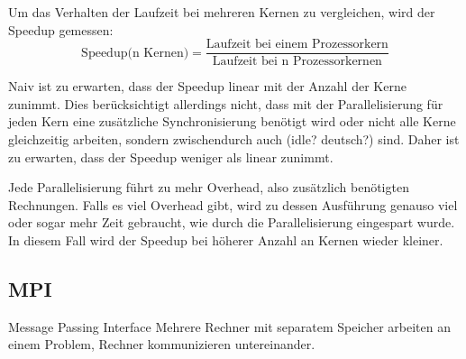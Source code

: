 	Um das Verhalten der Laufzeit bei mehreren Kernen zu vergleichen, wird der Speedup gemessen:
	\begin{equation}
	\text{Speedup(n Kernen)}=\frac{\text{Laufzeit bei einem Prozessorkern}}{\text{Laufzeit bei n Prozessorkernen}}
	\label{eq:speedup}
	\end{equation}
	
	Naiv ist zu erwarten, dass der Speedup linear mit der Anzahl der Kerne zunimmt. Dies berücksichtigt allerdings nicht, dass mit der Parallelisierung für jeden Kern eine zusätzliche Synchronisierung benötigt wird oder nicht alle Kerne gleichzeitig arbeiten, sondern zwischendurch auch (idle? deutsch?) sind. Daher ist zu erwarten, dass der Speedup weniger als linear zunimmt\cite[vgl. ][S. 58 f.]{pachecoparallel}.
	
	
	
	Jede Parallelisierung führt zu mehr Overhead, also zusätzlich benötigten Rechnungen. Falls es viel Overhead gibt, wird zu dessen Ausführung genauso viel oder sogar mehr Zeit gebraucht, wie durch die Parallelisierung eingespart wurde. In diesem Fall wird der Speedup bei höherer Anzahl an Kernen wieder kleiner.
	\subsection{MPI}
	\label{subsecmpitheorie}
	Message Passing Interface
	Mehrere Rechner mit separatem Speicher arbeiten an einem Problem, Rechner kommunizieren untereinander.	